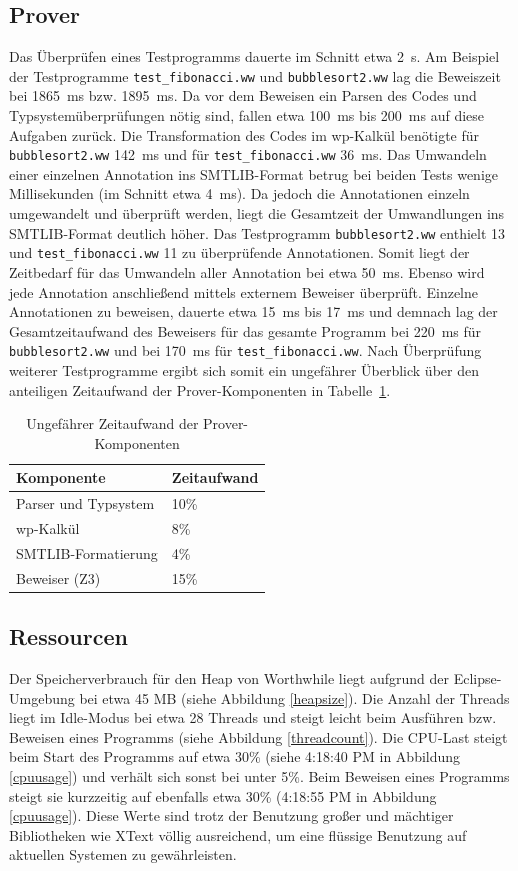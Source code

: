 \subsection{Prover}
Das Überprüfen eines Testprogramms dauerte im Schnitt etwa 2~s. Am Beispiel der Testprogramme \texttt{test\_fibonacci.ww} und \texttt{bubblesort2.ww} lag die Beweiszeit bei 1865~ms bzw. 1895~ms. Da vor dem Beweisen ein Parsen des Codes und Typsystemüberprüfungen nötig sind, fallen etwa 100~ms bis 200~ms auf diese Aufgaben zurück. Die Transformation des Codes im wp-Kalkül benötigte für \texttt{bubblesort2.ww} 142~ms und für \texttt{test\_fibonacci.ww} 36~ms. Das Umwandeln einer einzelnen Annotation ins SMTLIB-Format betrug bei beiden Tests wenige Millisekunden (im Schnitt etwa 4~ms). Da jedoch die Annotationen einzeln umgewandelt und überprüft werden, liegt die Gesamtzeit der Umwandlungen ins SMTLIB-Format deutlich höher. Das Testprogramm \texttt{bubblesort2.ww} enthielt 13 und \texttt{test\_fibonacci.ww} 11 zu überprüfende Annotationen. Somit liegt der Zeitbedarf für das Umwandeln aller Annotation bei etwa 50~ms. Ebenso wird jede Annotation anschließend mittels externem Beweiser überprüft. Einzelne Annotationen zu beweisen, dauerte etwa 15~ms bis 17~ms und demnach lag der Gesamtzeitaufwand des Beweisers für das gesamte Programm bei 220~ms für \texttt{bubblesort2.ww} und bei 170~ms für \texttt{test\_fibonacci.ww}. Nach Überprüfung weiterer Testprogramme ergibt sich somit ein ungefährer Überblick über den anteiligen Zeitaufwand der Prover-Komponenten in Tabelle~\ref{zeitaufwandprover}.

\begin{table}
\centering
\caption{Ungefährer Zeitaufwand der Prover-Komponenten}
\label{zeitaufwandprover}
\begin{tabular}{|l|l|}
\hline
\textbf{Komponente} & \textbf{Zeitaufwand} \\
\hline
Parser und Typsystem & 10\% \\
\hline
wp-Kalkül & 8\% \\
\hline
SMTLIB-Formatierung & 4\% \\
\hline
Beweiser (Z3) & 15\% \\
\hline
\end{tabular}
\end{table}

\subsection{Ressourcen}
Der Speicherverbrauch für den Heap von Worthwhile liegt aufgrund der Eclipse-Umgebung bei etwa 45 MB (siehe Abbildung \ref{heapsize}). Die Anzahl der Threads liegt im Idle-Modus bei etwa 28 Threads und steigt leicht beim Ausführen bzw. Beweisen eines Programms (siehe Abbildung \ref{threadcount}). Die CPU-Last steigt beim Start des Programms auf etwa 30\% (siehe 4:18:40 PM in Abbildung \ref{cpuusage}) und verhält sich sonst bei unter 5\%. Beim Beweisen eines Programms steigt sie kurzzeitig auf ebenfalls etwa 30\% (4:18:55 PM in Abbildung \ref{cpuusage}). Diese Werte sind trotz der Benutzung großer und mächtiger Bibliotheken wie XText völlig ausreichend, um eine flüssige Benutzung auf aktuellen Systemen zu gewährleisten.

